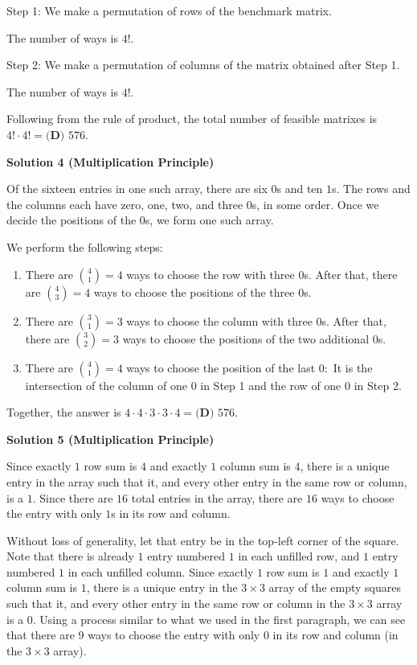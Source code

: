 \begin{enumerate}
 Step 1: We make a permutation of rows of the benchmark matrix.

 The number of ways is $4!$.

 Step 2: We make a permutation of columns of the matrix obtained after Step 1.

 The number of ways is $4!$.

 Following from the rule of product, the total number of feasible matrixes is $4! \cdot 4! = \boxed{\textbf{(D) }576}$.

 



\textbf{Solution 4 (Multiplication Principle)}

Of the sixteen entries in one such array, there are six $0$s and ten $1$s. The rows and the columns each have zero, one, two, and three $0$s, in some order. Once we decide the positions of the $0$s, we form one such array.

 We perform the following steps:

 
            \begin{enumerate} 
        \item There are $\binom41=4$ ways to choose the row with three $0$s. After that, there are $\binom43=4$ ways to choose the positions of the three $0$s.

        \item There are $\binom31=3$ ways to choose the column with three $0$s. After that, there are $\binom32=3$ ways to choose the positions of the two additional $0$s.

        \item There are $\binom41=4$ ways to choose the position of the last $0:$ It is the intersection of the column of one $0$ in Step 1 and the row of one $0$ in Step 2.

            \end{enumerate}
            Together, the answer is $4\cdot4\cdot3\cdot3\cdot4=\boxed{\textbf{(D) }576}.$




\textbf{Solution 5 (Multiplication Principle)}

Since exactly $1$ row sum is $4$ and exactly $1$ column sum is $4$, there is a unique entry in the array such that it, and every other entry in the same row or column, is a $1.$ Since there are $16$ total entries in the array, there are $16$ ways to choose the entry with only $1$s in its row and column.

 Without loss of generality, let that entry be in the top-left corner of the square. Note that there is already $1$ entry numbered $1$ in each unfilled row, and $1$ entry numbered $1$ in each unfilled column. Since exactly $1$ row sum is $1$ and exactly $1$ column sum is $1$, there is a unique entry in the $3\times3$ array of the empty squares such that it, and every other entry in the same row or column in the $3\times3$ array is a $0.$ Using a process similar to what we used in the first paragraph, we can see that there are $9$ ways to choose the entry with only $0$ in its row and column (in the $3\times3$ array). 


\end{enumerate}
